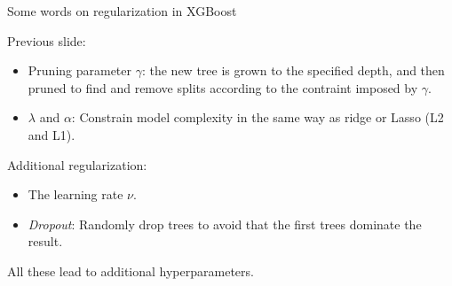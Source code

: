 \documentclass[
  10pt,
  ignorenonframetext,
]{beamer}
\providecommand{\tightlist}{%
  \setlength{\itemsep}{0pt}\setlength{\parskip}{0pt}}
\begin{document}
\begin{frame}
\begin{block}{Some words on regularization in XGBoost}
\protect\hypertarget{some-words-on-regularization-in-xgboost}{}
\(~\)

Previous slide:

\vspace{2mm}

\begin{itemize}
\tightlist
\item
  Pruning parameter \(\gamma\): the new tree is grown to the specified
  depth, and then pruned to find and remove splits according to the
  contraint imposed by \(\gamma\).
\end{itemize}

\vspace{2mm}

\begin{itemize}
\tightlist
\item
  \(\lambda\) and \(\alpha\): Constrain model complexity in the same way
  as ridge or Lasso (L2 and L1).
\end{itemize}

\vspace{4mm}

Additional regularization:

\vspace{2mm}

\begin{itemize}
\tightlist
\item
  The learning rate \(\nu\).
\end{itemize}

\vspace{3mm}

\begin{itemize}
\tightlist
\item
  \emph{Dropout}: Randomly drop trees to avoid that the first trees
  dominate the result.
\end{itemize}

\vspace{3mm}

All these lead to additional hyperparameters.
\end{block}
\end{frame}
\end{document}

